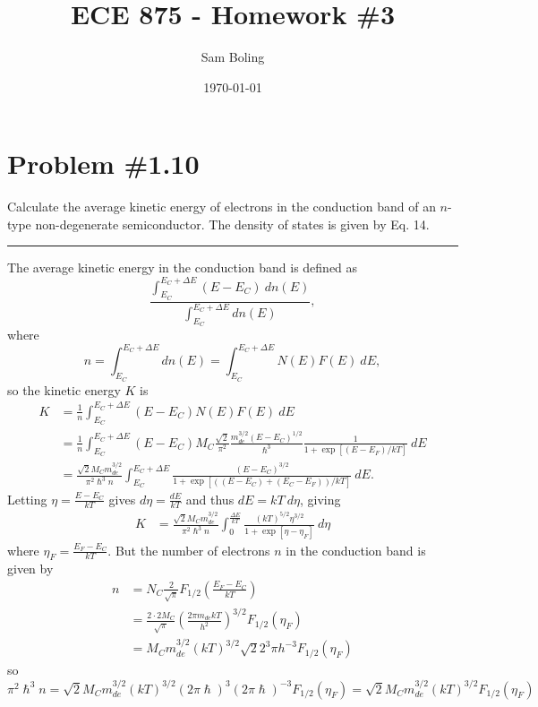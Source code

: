 \documentclass{article}
\title{ECE 875 - Homework \#3}
\author{Sam Boling}
\date{\today}
\newcommand{\horline}
           {\begin{center}
              \noindent\rule{8cm}{0.4pt}
            \end{center}}
\begin{document}
\maketitle

\section*{Problem \#1.10}
Calculate the average kinetic energy of electrons in the conduction band of
an $n$-type non-degenerate semiconductor. The density of states is given by
Eq. 14.
\horline
The average kinetic energy in the conduction band is defined as
$$
\frac{\int_{E_C}^{E_C + \Delta E} (E - E_C) ~dn(E)}
     {\int_{E_C}^{E_C + \Delta E} dn(E)},
$$
where
$$
n = \int_{E_C}^{E_C + \Delta E} dn(E) 
  = \int_{E_C}^{E_C + \Delta E} N(E) F(E) ~dE,
$$
so the kinetic energy $K$ is
\begin{align*}
K &= \frac{1}{n}\int_{E_C}^{E_C + \Delta E} (E - E_C) N(E) F(E) ~dE \\
  &= \frac{1}{n}\int_{E_C}^{E_C + \Delta E} 
             (E - E_C) 
             M_C \frac{\sqrt{2}}{\pi^2}
                 \frac{m_{de}^{3/2}(E - E_C)^{1/2}}{\hslash^3}
                 \frac{1}{1 + \exp[(E - E_F)/kT]} ~dE \\
  &= \frac{\sqrt{2} M_C m_{de}^{3/2}}{\pi^2 \hslash^3 n}
     \int_{E_C}^{E_C + \Delta E} 
        \frac{(E - E_C)^{3/2}}
             {1 + \exp[((E - E_C) + (E_C - E_F))/kT]} ~dE.
\end{align*}
Letting $\eta = \frac{E - E_C}{kT}$ gives $d\eta = \frac{dE}{kT}$ and
thus $dE = kT ~d\eta$, giving
\begin{align*}
K &=  \frac{\sqrt{2} M_C m_{de}^{3/2}}{\pi^2 \hslash^3 n}
   \int_{0}^{\frac{\Delta E}{kT}} 
     \frac{(kT)^{5/2}\eta^{3/2}}{1 + \exp[\eta - \eta_F]} ~d\eta
\end{align*}
where $\eta_F = \frac{E_F - E_C}{kT}$.
But the number of electrons $n$ in the conduction band is given by
\begin{align*}
n &= N_C \frac{2}{\sqrt{\pi}} F_{1/2}\left(\frac{E_F - E_C}{kT}\right) \\
  &= \frac{2 \cdot 2 M_C}{\sqrt{\pi}} 
    \left(\frac{2 \pi m_{de} kT}{h^2}\right)^{3/2} 
    F_{1/2}(\eta_F) \\
  &= M_C m_{de}^{3/2} (kT)^{3/2} \sqrt{2}2^3 \pi h^{-3}
    F_{1/2}(\eta_F)
\end{align*}
so
$$
\pi^2 \hslash^3 n = \sqrt{2} M_C m_{de}^{3/2} (kT)^{3/2} 
                    (2\pi\hslash)^3 (2 \pi \hslash)^{-3}
                    F_{1/2}(\eta_F)
                  = \sqrt{2} M_C m_{de}^{3/2} (kT)^{3/2}
                    F_{1/2}(\eta_F)
$$
\end{document}
